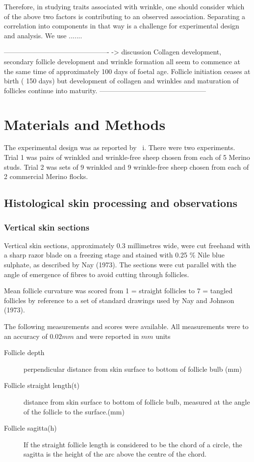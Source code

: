 \documentclass{article}
\begin{document}
Therefore, in studying traits associated with wrinkle, one should consider which of the above two factors is contributing to an observed association. Separating a correlation into components in that way is a challenge for experimental design and analysis.  We use .......

----------------------------------------------  -> discussion
Collagen development, secondary follicle development and wrinkle formation  all seem to commence at the same time of approximately 100 days of foetal age.  Follicle initiation ceases at birth ( 150 days) but development of collagen and wrinkles  and maturation of follicles continue into maturity. 
-----------------------------------------------

\section{Materials and Methods}
The experimental design was as reported by ~\cite{watts-2020}i. There were  two experiments. Trial 1 was pairs of wrinkled and wrinkle-free sheep chosen from each of 5 Merino studs. Trial 2 was sets of 9 wrinkled and 9 wrinkle-free sheep chosen from each of 2 commercial Merino flocks.

\subsection{Histological skin processing and observations}

\subsubsection{Vertical skin sections}
Vertical skin sections, approximately 0.3 millimetres wide, were cut freehand with a sharp razor blade on a freezing stage and stained with 0.25 \% Nile blue sulphate, as described by Nay (1973).  The sections were cut parallel with the angle of emergence of fibres to avoid cutting through follicles.

 Mean follicle curvature was scored from 1 = straight follicles to 7 = tangled follicles by reference to a set of standard drawings used by Nay and Johnson (1973).  

The following measurements and scores were available.  All measurements were to an accuracy of $0.02mm$ and were reported in $mm$ units
\begin{description}
\item[Follicle depth] perpendicular distance from skin surface to bottom of follicle bulb (mm)
\item[Follicle straight length(t)] distance from skin surface to bottom of follicle bulb, measured at the angle of the follicle to the surface.(mm)
\item[Follicle sagitta(h)] If the straight follicle length is considered to be the chord of a circle, the sagitta is the height of the arc above the centre of the chord.
\end{description}
\end{document}
